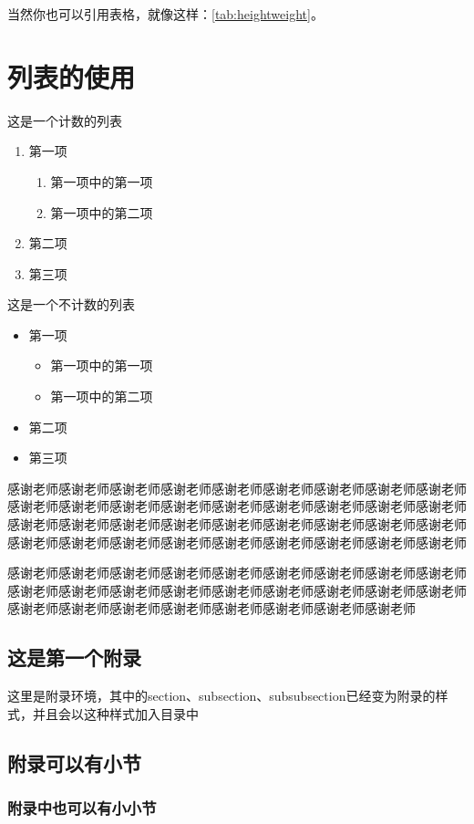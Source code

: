 \documentclass[supercite]{HustGraduPaper}
\begin{document}
	当然你也可以引用表格，就像这样：\autoref{tab:heightweight}。
	
	\section{列表的使用}
	这是一个计数的列表
	\begin{enumerate}
		\item 第一项
			\begin{enumerate}
				\item 第一项中的第一项
				\item 第一项中的第二项
			\end{enumerate}
		\item 第二项
		\item 第三项
	\end{enumerate}

	这是一个不计数的列表
	\begin{itemize}
		\item 第一项
		\begin{itemize}
			\item 第一项中的第一项
			\item 第一项中的第二项
		\end{itemize}
		\item 第二项
		\item 第三项
	\end{itemize}
	
	\begin{thankpage}
		感谢老师感谢老师感谢老师感谢老师感谢老师感谢老师感谢老师感谢老师感谢老师感谢老师感谢老师感谢老师感谢老师感谢老师感谢老师感谢老师感谢老师感谢老师感谢老师感谢老师感谢老师感谢老师感谢老师感谢老师感谢老师感谢老师感谢老师感谢老师感谢老师感谢老师感谢老师感谢老师感谢老师感谢老师感谢老师感谢老师
		
		感谢老师感谢老师感谢老师感谢老师感谢老师感谢老师感谢老师感谢老师感谢老师感谢老师感谢老师感谢老师感谢老师感谢老师感谢老师感谢老师感谢老师感谢老师感谢老师感谢老师感谢老师感谢老师感谢老师感谢老师感谢老师感谢老师
	\end{thankpage}
	
	
	
	\begin{appendices}
		\section{这是第一个附录}
		这里是附录环境，其中的section、subsection、subsubsection已经变为附录的样式，并且会以这种样式加入目录中
		\subsection{附录可以有小节}
		\subsubsection{附录中也可以有小小节}
	\end{appendices}
	
\end{document}
